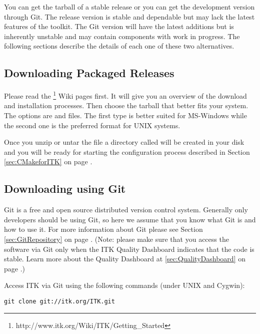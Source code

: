 You can get the tarball of a stable release or you can get the
development version through Git.  The release version is stable and
dependable but may lack the latest features of the toolkit. The Git
version will have the latest additions but is inherently unstable and
may contain components with work in progress.  The following sections
describe the details of each one of these two alternatives.

\subsection{Downloading Packaged Releases}
\label{sec:DownloadingReleases}


Please read the
\footnote{http://www.itk.org/Wiki/ITK/Getting\_Started}
Wiki pages first. It will give you an overview of the download and installation
processes. Then choose the tarball that better fits your system. The options
are  and  files.  The first type is better suited for
MS-Windows while the second one is the preferred format for UNIX systems.

Once you unzip or untar the file a directory called  will be
created in your disk and you will be ready for starting the configuration
process described in Section \ref{sec:CMakeforITK} on page
\pageref{sec:CMakeforITK}.

\subsection{Downloading using Git}
\label{sec:DownloadingFromGit}


Git is a free and open source distributed version control system.
Generally only developers should be using Git, so here we
assume that you know what Git is and how to use it.  For more information
about Git please see Section \ref{sec:GitRepository} on page
\pageref{sec:GitRepository}. (Note: please make sure that you access the
software via Git only when the ITK Quality Dashboard indicates that the
code is stable. Learn more about the Quality Dashboard at
\ref{sec:QualityDashboard} on page \pageref{sec:QualityDashboard}.)

Access ITK via Git using the following commands (under UNIX and Cygwin):
\begin{verbatim}
git clone git://itk.org/ITK.git
\end{verbatim}

